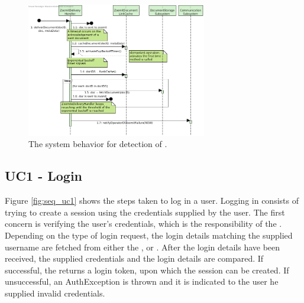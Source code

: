 \begin{figure}[!htp]
    \centering
    \includegraphics[width=0.7\textwidth]{figures/Av3 - Zoomit failure.png}
    \caption{The system behavior for detection of .
        }\label{fig:seq_av3fail}
\end{figure}



\subsection{UC1 - Login}\label{sec:seq_uc1}
Figure \ref{fig:seq_uc1} shows the steps taken to log in a user. Logging in consists of trying to create a session using the credentials supplied by the user. The first concern is verifying the user's credentials, which is the responsibility of the . Depending on the type of login request, the login details matching the supplied username are fetched from either the ,  or . After the login details have been received, the supplied credentials and the login details are compared. If successful, the  returns a login token, upon which the session can be created. If unsuccessful, an AuthException is thrown and it is indicated to the user he supplied invalid credentials.

